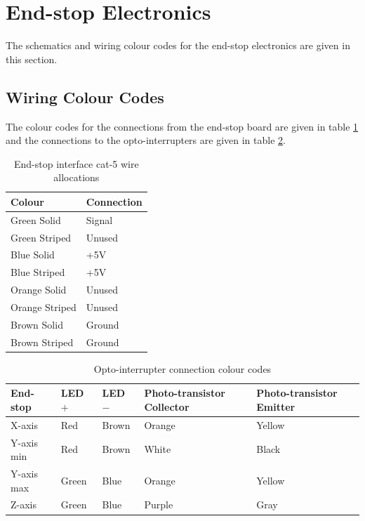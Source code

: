 	\section{End-stop Electronics}
		
		The schematics and wiring colour codes for the end-stop electronics are
		given in this section.
		
		\subsection{Wiring Colour Codes}
			
			The colour codes for the connections from the end-stop board are given in
			table \ref{tab:endstopinterface} and the connections to the
			opto-interrupters are given in table \ref{tab:endstopoptoconnect}.
			
			\begin{table}[p]
				\centering
				\begin{tabular}{l l}
					\toprule
					Colour & Connection \\
					\midrule
					Green Solid    & Signal \\
					Green Striped  & Unused \\
					Blue Solid     & +5V \\
					Blue Striped   & +5V \\
					Orange Solid   & Unused \\
					Orange Striped & Unused \\
					Brown Solid    & Ground \\
					Brown Striped  & Ground \\
					\bottomrule
				\end{tabular}
				
				\caption{End-stop interface cat-5 wire allocations \cite{endstop}}
				\label{tab:endstopinterface}
			\end{table}
			
			\begin{table}[p]
				\centering
				\begin{tabular}{l l l l l}
					\toprule
					End-stop & LED $+$ & LED $-$ & Photo-transistor Collector & Photo-transistor Emitter \\
					\midrule
					X-axis     & Red    & Brown  & Orange & Yellow \\
					\addlinespace
					Y-axis min & Red    & Brown  & White  & Black  \\
					Y-axis max & Green  & Blue   & Orange & Yellow \\
					\addlinespace
					Z-axis     & Green  & Blue   & Purple & Gray   \\
					\bottomrule
				\end{tabular}
				
				\caption{Opto-interrupter connection colour codes}
				\label{tab:endstopoptoconnect}
			\end{table}
			
